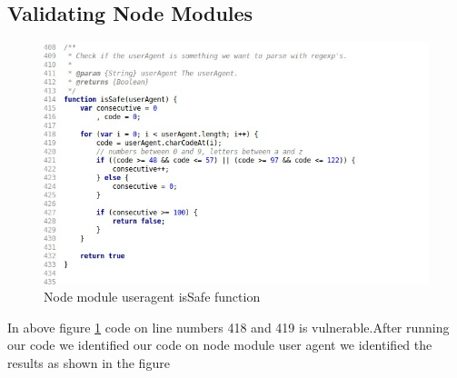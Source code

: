 \documentclass[authoryear,preprint]{sigplanconf}
\begin{document}
\subsection{Validating Node Modules}

\begin{figure}[ht]
\centering
\includegraphics[width=1\linewidth]{figures/useragent-isSafe}
\caption[Node module useragent isSafe function]{\label{f:isSafe}Node module useragent isSafe function}
\end{figure}
In above figure \ref{f:isSafe} code on line numbers 418 and 419 is vulnerable.After running our code we identified our code on node module user agent we identified  the results as shown in the figure 
\end{document}
